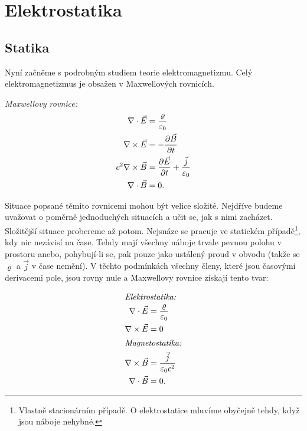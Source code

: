 \chapter{Elektrostatika}\label{chap:fey_electrostatics}
\minitoc
\newpage
  \section{Statika}
    \cite[s.~63]{Feynman02} Nyní začněme s podrobným studiem teorie elektromagnetizmu. Celý     
    elektromagnetizmus je obsažen v Maxwellových rovnicích.
    
    \emph{Maxwellovy rovnice:}
    \begin{align}\label{fyz:fey_eq_elstat01}
      \nabla\cdot\vec{E} &=  \frac{\varrho}{\varepsilon_0}                     \\
        \nabla\times\vec{E} &= -\frac{\partial \vec{B}}{\partial t}                                 \\
     c^2\nabla\times\vec{B} &=  \frac{\partial \vec{E}}{\partial t} + \frac{\vec{j}}{\varepsilon_0} \\
      \nabla\cdot\vec{B} &= 0.                               
    \end{align}
     
    Situace popsané těmito rovnicemi mohou být velice složité. Nejdříve budeme uvažovat o poměrně
    jednoduchých situacích a učit se, jak s nimi zacházet. Složitější situace probereme až potom. 
    Nejsnáze se pracuje ve statickém případě\footnote{Vlastně stacionárním případě. O elektrostatice 
    mluvíme obyčejně tehdy, když jsou náboje nehybné.}, kdy nic nezávisí na čase. Tehdy mají všechny
    náboje trvale pevnou polohu v prostoru anebo, pohybují-li se, pak pouze jako ustálený proud v 
    obvodu (takže se \(\varrho\) a \(\vec{j}\) v čase nemění). V těchto podmínkách všechny členy, 
    které jsou časovými derivacemi pole, jsou rovny nule a Maxwellovy rovnice získají tento tvar:
     
    \begin{align}
     \shortintertext{\emph{Elektrostatika:}} 
      \nabla\cdot\vec{E} &=  \frac{\varrho}{\varepsilon_0}    \label{fyz:fey_eq_elstat02a}   \\  
        \nabla\times\vec{E} &= 0                                 \label{fyz:fey_eq_elstat02b}   \\
      \shortintertext{\emph{Magnetostatika:}}  
        \nabla\times\vec{B} &=  \frac{\vec{j}}{\varepsilon_0c^2} \label{fyz:fey_eq_elstat02c}   \\
      \nabla\cdot\vec{B} &= 0.                                \label{fyz:fey_eq_elstat02d}
    \end{align}    
     
